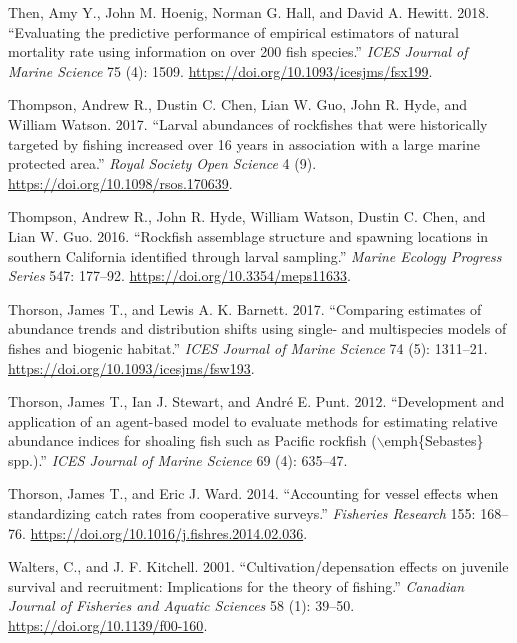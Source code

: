 \documentclass[
  english,
  a4paper,
]{article}
\newlength{\cslhangindent}
\newlength{\cslentryspacingunit} %
\newenvironment{CSLReferences}[2] %
 {%
  \setlength{\parindent}{0pt}
  \ifodd #1
  \let\oldpar\par
  \def\par{\hangindent=\cslhangindent\oldpar}
  \fi
  \setlength{\parskip}{#2\cslentryspacingunit}
 }%
 {}
\begin{document}
\begin{CSLReferences}{1}{0}
\leavevmode{}%
Then, Amy Y., John M. Hoenig, Norman G. Hall, and David A. Hewitt. 2018. {``{Evaluating the predictive performance of empirical estimators of natural mortality rate using information on over 200 fish species}.''} \emph{ICES Journal of Marine Science} 75 (4): 1509. \url{https://doi.org/10.1093/icesjms/fsx199}.

\leavevmode{}%
Thompson, Andrew R., Dustin C. Chen, Lian W. Guo, John R. Hyde, and William Watson. 2017. {``{Larval abundances of rockfishes that were historically targeted by fishing increased over 16 years in association with a large marine protected area}.''} \emph{Royal Society Open Science} 4 (9). \url{https://doi.org/10.1098/rsos.170639}.

\leavevmode{}%
Thompson, Andrew R., John R. Hyde, William Watson, Dustin C. Chen, and Lian W. Guo. 2016. {``{Rockfish assemblage structure and spawning locations in southern California identified through larval sampling}.''} \emph{Marine Ecology Progress Series} 547: 177--92. \url{https://doi.org/10.3354/meps11633}.

\leavevmode{}%
Thorson, James T., and Lewis A. K. Barnett. 2017. {``{Comparing estimates of abundance trends and distribution shifts using single- and multispecies models of fishes and biogenic habitat}.''} \emph{ICES Journal of Marine Science} 74 (5): 1311--21. \url{https://doi.org/10.1093/icesjms/fsw193}.

\leavevmode{}%
Thorson, James T., Ian J. Stewart, and André E. Punt. 2012. {``{Development and application of an agent-based model to evaluate methods for estimating relative abundance indices for shoaling fish such as Pacific rockfish (\(\backslash\)emph{\{}Sebastes{\}} spp.)}.''} \emph{ICES Journal of Marine Science} 69 (4): 635--47.

\leavevmode{}%
Thorson, James T., and Eric J. Ward. 2014. {``{Accounting for vessel effects when standardizing catch rates from cooperative surveys}.''} \emph{Fisheries Research} 155: 168--76. \url{https://doi.org/10.1016/j.fishres.2014.02.036}.

\leavevmode{}%
Walters, C., and J. F. Kitchell. 2001. {``{Cultivation/depensation effects on juvenile survival and recruitment: Implications for the theory of fishing}.''} \emph{Canadian Journal of Fisheries and Aquatic Sciences} 58 (1): 39--50. \url{https://doi.org/10.1139/f00-160}.


\end{CSLReferences}
\end{document}
